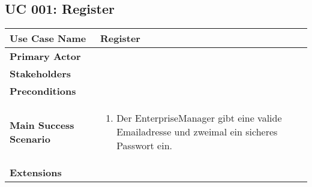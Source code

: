\subsection{UC 001: Register}
\label{uc:001-register}

\begin{tabular}{|l|p{}|}
\hline
\textbf{Use Case Name} 	&	Register	\\ \hline
\textbf{Primary Actor} 	&		\\ \hline
\textbf{Stakeholders}	&		\\ \hline
\textbf{Preconditions}	&		\\ \hline
\textbf{Main Success Scenario}	& 	
\begin{enumerate}
	\item Der EnterpriseManager gibt eine valide Emailadresse und zweimal ein sicheres Passwort ein.
\end{enumerate}
\\ \hline
\textbf{Extensions}	& 	\\ \hline
\end{tabular}